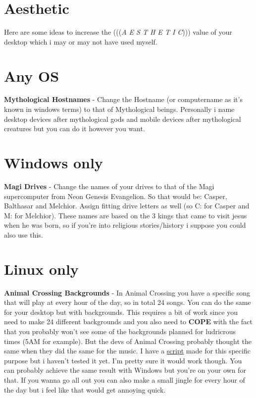 \documentclass{article}
\begin{document}
\section{Aesthetic}
Here are some ideas to increase the (((\emph{A E S T H E T I C}))) value of your desktop which i may or may not have used myself.
\section{Any OS}
\textbf{Mythological Hostnames} - Change the Hostname (or computername as it's known in windows terms) to that of Mythological beings. Personally i name desktop devices after mythological gods and mobile devices after mythological creatures but you can do it however you want.
\section{Windows only}
\textbf{Magi Drives} - Change the names of your drives to that of the Magi supercomputer from Neon Genesis Evangelion. So that would be: Casper, Balthasar and Melchior. Assign fitting drive letters as well (so C: for Casper and M: for Melchior). These names are based on the 3 kings that came to visit jesus when he was born, so if you're into religious stories/history i suppose you could also use this.
\section{Linux only}
\textbf{Animal Crossing Backgrounds} - In Animal Crossing you have a specific song that will play at every hour of the day, so in total 24 songs. You can do the same for your desktop but with backgrounds. This requires a bit of work since you need to make 24 different backgrounds and you also need to \textbf{COPE} with the fact that you probably won't see some of the backgrounds planned for ludricrous times (5AM for example). But the devs of Animal Crossing probably thought the same when they did the same for the music. I have a \href{https://github.com/marcello505/configfiles/blob/master/.scripts/clockbackgrounds.sh}{script} made for this specific purpose but i haven't tested it yet. I'm pretty sure it would work though. You can probably achieve the same result with Windows but you're on your own for that. If you wanna go all out you can also make a small jingle for every hour of the day but i feel like that would get annoying quick.
\end{document}
